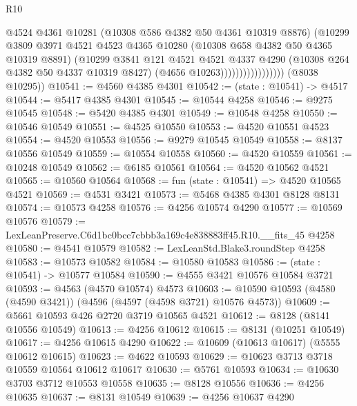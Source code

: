 \begin{lexlean}{R10}
\begin{coremodule}
                                  @4524
                                  @4361
                                  @10281
                                  (@10308 @586 @4382 @50 @4361 @10319 @8876)
                                  (@10299
                                    @3809
                                    @3971
                                    @4521
                                    @4523
                                    @4365
                                    @10280
                                    (@10308 @658 @4382 @50 @4365 @10319 @8891)
                                    (@10299
                                      @3841
                                      @121
                                      @4521
                                      @4521
                                      @4337
                                      @4290
                                      (@10308 @264 @4382 @50 @4337 @10319 @8427)
                                      (@4656 @10263)))))))))))))))))
      (@8038 @10295))
@10541 := @4560 @4385 @4301
@10542 := (state : @10541) -> @4517
@10544 := @5417 @4385 @4301
@10545 := @10544 @4258
@10546 := @9275 @10545
@10548 := @5420 @4385 @4301
@10549 := @10548 @4258
@10550 := @10546 @10549
@10551 := @4525 @10550
@10553 := @4520 @10551 @4523
@10554 := @4520 @10553
@10556 := @9279 @10545 @10549
@10558 := @8137 @10556 @10549
@10559 := @10554 @10558
@10560 := @4520 @10559
@10561 := @10248 @10549
@10562 := @6185 @10561
@10564 := @4520 @10562 @4521
@10565 := @10560 @10564
@10568 := fun (state : @10541) => @4520 @10565 @4521
@10569 := @4531 @3421
@10573 := @5468 @4385 @4301 @8128 @8131
@10574 := @10573 @4258
@10576 := @4256 @10574 @4290
@10577 := @10569 @10576
@10579 := LexLeanPreserve.C6d1bc0bcc7cbbb3a169c4e838883ff45.R10.__fits_45 @4258
@10580 := @4541 @10579
@10582 := LexLeanStd.Blake3.roundStep @4258
@10583 := @10573 @10582
@10584 := @10580 @10583
@10586 := (state : @10541) -> @10577 @10584
@10590 := @4555 @3421 @10576 @10584 @3721
@10593 := @4563 (@4570 @10574) @4573
@10603 := @10590 @10593 (@4580 (@4590 @3421)) (@4596 (@4597 (@4598 @3721) @10576 @4573))
@10609 := @5661 @10593 @426 @2720 @3719 @10565 @4521
@10612 := @8128 (@8141 @10556 @10549)
@10613 := @4256 @10612
@10615 := @8131 (@10251 @10549)
@10617 := @4256 @10615 @4290
@10622 := @10609 (@10613 @10617) (@5555 @10612 @10615)
@10623 := @4622 @10593
@10629 := @10623 @3713 @3718 @10559 @10564 @10612 @10617
@10630 := @5761 @10593
@10634 := @10630 @3703 @3712 @10553 @10558
@10635 := @8128 @10556
@10636 := @4256 @10635
@10637 := @8131 @10549
@10639 := @4256 @10637 @4290

\end{coremodule}
\end{lexlean}
